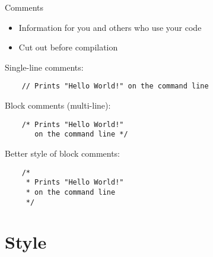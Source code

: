\documentclass[10pt,graphics,aspectratio=169,table]{beamer}
\begin{document}
\begin{frame}[fragile]{Comments}
	\begin{itemize}
		\item Information for you and others who use your code
		\item Cut out before compilation
	\end{itemize}
	Single-line comments:
	\begin{lstlisting}
	// Prints "Hello World!" on the command line
\end{lstlisting}
	Block comments (multi-line):
	\begin{lstlisting}
	/* Prints "Hello World!"
	   on the command line */
\end{lstlisting}
	Better style of block comments:
	\begin{lstlisting}
	/*
	 * Prints "Hello World!"
	 * on the command line
	 */
\end{lstlisting}
\end{frame}
\section{Style}
\end{document}
